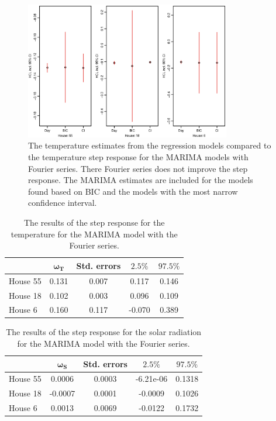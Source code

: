 \begin{figure}[ht]
    \centering
    \includegraphics[width=0.8\textwidth]{../../../figures/MarimaHCLF.eps}
    \caption{The temperature estimates from the regression models compared to the temperature step response for the MARIMA models with Fourier series. There Fourier series does not improve the step response. The MARIMA estimates are included for the models found based on BIC and the models with the most narrow confidence interval.}
    \label{fig:HCLF}
\end{figure}

\begin{table}[ht]
    \centering
    \begin{tabular}{l|cccc}
    \hline
     & $\bm{\omega_{T}}$ & \textbf{Std. errors} & $\bm{2.5\%}$ & $\bm{97.5\%}$ \\ \hline \hline
    House 55 & 0.131 & 0.007 & 0.117 & 0.146 \\
    House 18 & 0.102 & 0.003 & 0.096 & 0.109 \\
    House 6  & 0.160 & 0.117 & -0.070 & 0.389\\
    \hline
    \end{tabular}
    \caption{The results of the step response for the temperature for the MARIMA model with the Fourier series.}
    \label{tab: result_temp}
 \end{table}
 \begin{table}
    \centering
    \begin{tabular}{l|cccc}
    \hline
     & $\bm{\omega_S}$ & \textbf{Std. errors} & $\bm{2.5\%}$ & $\bm{97.5\%}$ \\ \hline \hline
    House 55 & 0.0006 & 0.0003 & -6.21e-06 & 0.1318 \\
    House 18 & -0.0007 & 0.0001 & -0.0009 & 0.1026 \\
    House 6  & 0.0013 & 0.0069 & -0.0122 & 0.1732 \\
    \hline
    \end{tabular}
    \caption{The results of the step response for the solar radiation for the MARIMA model with the Fourier series.}
    \label{tab: result_solar}
 \end{table}


